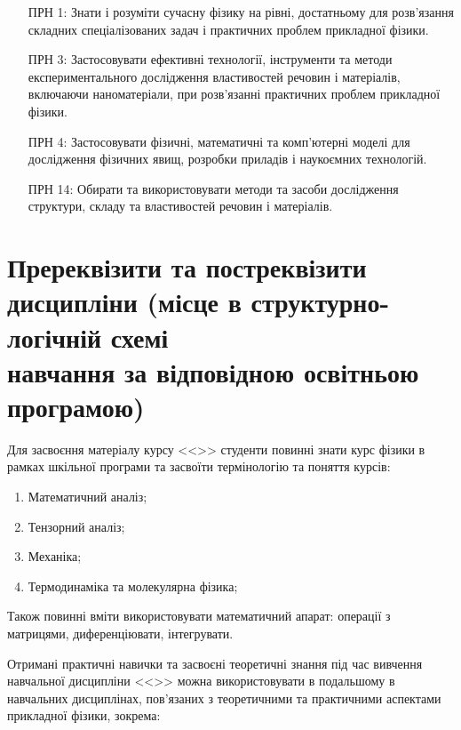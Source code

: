 \documentclass{Syllabus}
\begin{document}
\begin{enumerate}
	\item [ПРН 1:] Знати і розуміти сучасну фізику на рівні, достатньому для розв'язання складних спеціалізованих задач і практичних проблем прикладної фізики.
   	\item [ПРН 3:] Застосовувати ефективні технології, інструменти та методи експериментального дослідження властивостей речовин і матеріалів, включаючи наноматеріали, при розв’язанні практичних проблем прикладної фізики.
	\item [ПРН 4:] Застосовувати фізичні, математичні та комп'ютерні моделі для дослідження фізичних явищ, розробки приладів і наукоємних технологій.
	\item [ПРН 14:] Обирати та використовувати методи та засоби дослідження структури, складу та властивостей речовин і матеріалів.
\end{enumerate}


\section{Пререквізити та постреквізити дисципліни (місце в структурно-логічній схемі\\ навчання за відповідною освітньою програмою)}


Для засвоєння матеріалу курсу <<\discipline>> студенти повинні знати курс фізики в рамках шкільної програми та засвоїти термінологію та поняття курсів:
\begin{enumerate}
	\item Математичний аналіз;
	\item Тензорний аналіз;
	\item Механіка;
	\item Термодинаміка та молекулярна фізика;
\end{enumerate}

Також повинні вміти використовувати математичний апарат: операції з матрицями,  диференціювати, інтегрувати.

Отримані практичні навички та засвоєні теоретичні знання під час вивчення навчальної дисципліни <<\discipline>> можна використовувати в подальшому в навчальних дисциплінах, пов’язаних з теоретичними та практичними аспектами прикладної фізики, зокрема:
\end{document}
